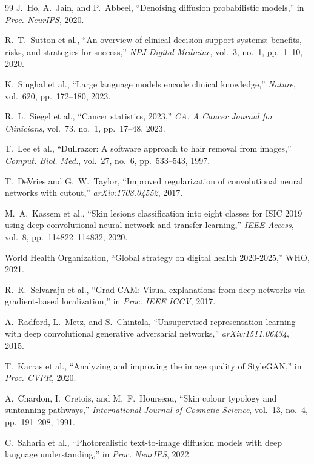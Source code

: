 \documentclass[10pt, twocolumn, letterpaper]{article}
\begin{document}
\begin{thebibliography}{99}
 J.~Ho, A.~Jain, and P.~Abbeel, ``Denoising diffusion probabilistic models,'' in \textit{Proc. NeurIPS}, 2020.

 R.~T.~Sutton et al., ``An overview of clinical decision support systems: benefits, risks, and strategies for success,'' \textit{NPJ Digital Medicine}, vol.~3, no.~1, pp.~1--10, 2020.

 K.~Singhal et al., ``Large language models encode clinical knowledge,'' \textit{Nature}, vol.~620, pp.~172--180, 2023.

 R.~L.~Siegel et al., ``Cancer statistics, 2023,'' \textit{CA: A Cancer Journal for Clinicians}, vol.~73, no.~1, pp.~17--48, 2023.

 T.~Lee et al., ``Dullrazor: A software approach to hair removal from images,'' \textit{Comput. Biol. Med.}, vol.~27, no.~6, pp.~533--543, 1997.

 T.~DeVries and G.~W.~Taylor, ``Improved regularization of convolutional neural networks with cutout,'' \textit{arXiv:1708.04552}, 2017.

 M.~A.~Kassem et al., ``Skin lesions classification into eight classes for ISIC 2019 using deep convolutional neural network and transfer learning,'' \textit{IEEE Access}, vol.~8, pp.~114822--114832, 2020.

 World Health Organization, ``Global strategy on digital health 2020-2025,'' WHO, 2021.

 R.~R.~Selvaraju et al., ``Grad-CAM: Visual explanations from deep networks via gradient-based localization,'' in \textit{Proc. IEEE ICCV}, 2017.

 A.~Radford, L.~Metz, and S.~Chintala, ``Unsupervised representation learning with deep convolutional generative adversarial networks,'' \textit{arXiv:1511.06434}, 2015.

 T.~Karras et al., ``Analyzing and improving the image quality of StyleGAN,'' in \textit{Proc. CVPR}, 2020.

 A.~Chardon, I.~Cretois, and M.~F.~Hourseau, ``Skin colour typology and suntanning pathways,'' \textit{International Journal of Cosmetic Science}, vol.~13, no.~4, pp.~191--208, 1991.

 C.~Saharia et al., ``Photorealistic text-to-image diffusion models with deep language understanding,'' in \textit{Proc. NeurIPS}, 2022.


\end{thebibliography}
\end{document}

